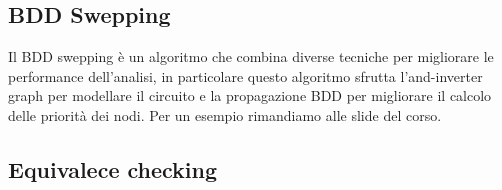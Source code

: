 \begin{figure}
\end{figure}
\subsection{BDD Swepping}
Il BDD swepping è un algoritmo che combina diverse tecniche per migliorare le performance dell'analisi, in particolare questo algoritmo sfrutta l'and-inverter graph per modellare il circuito e la propagazione BDD per migliorare il calcolo delle priorità dei nodi. Per un esempio rimandiamo alle slide del corso.
\subsection{Equivalece checking}
